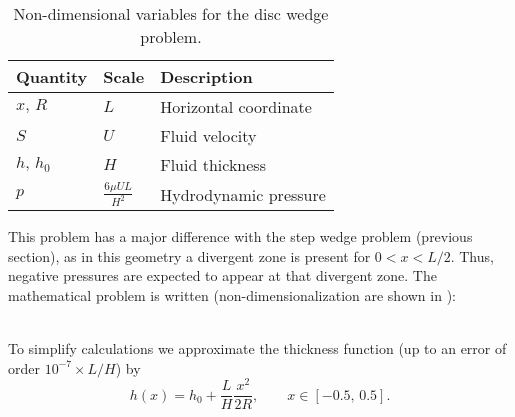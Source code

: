 \begin{table}[ht]
\centering
\begin{tabular}{lll}
\toprule
Quantity & Scale & Description\\
\midrule
$x,\,R$ & $L$ & Horizontal coordinate \\
$S$ & $U$ & Fluid velocity \\
$h,\,h_0$ & $H$ & Fluid thickness \\
$p$ & $\frac{6\mu U L}{H^2}$ & Hydrodynamic pressure\\
\bottomrule
\end{tabular}
\caption{Non-dimensional variables for the disc wedge problem.}\label{tab:table_non_dim_disc}
\end{table}

This problem has a major difference with the step wedge problem (previous section), as in this geometry a divergent zone is present for $0<x<L/2$. Thus, negative pressures are expected to appear at that divergent zone. The mathematical problem is written (non-dimensionalization are shown in ):

\\

To simplify calculations we approximate the thickness function (up to an error of order $10^{-7}\times L/H$) by 
$$h(x) =h_0+\frac{L}{H}\frac{x^2}{2R},\qquad x\in [-0.5,\,0.5].$$

